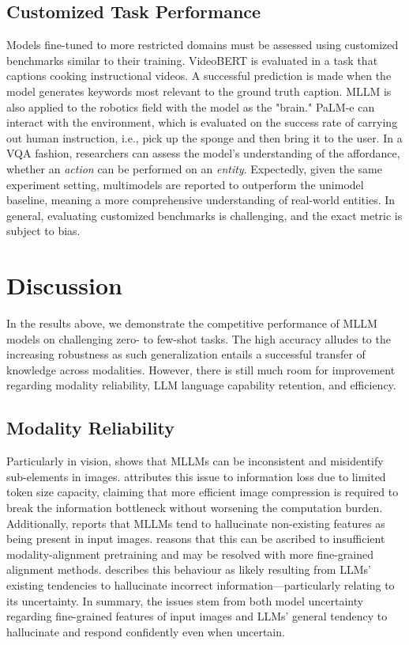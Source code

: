 \documentclass[11pt]{article}
\begin{document}
\subsection{Customized Task Performance}
Models fine-tuned to more restricted domains must be assessed using customized benchmarks similar to their training. VideoBERT \citep{DBLP:conf/iccv/SunMV0S19} is evaluated in a task that captions cooking instructional videos. A successful prediction is made when the model generates keywords most relevant to the ground truth caption. MLLM is also applied to the robotics field with the model as the "brain." PaLM-e \citep{DBLP:conf/icml/DriessXSLCIWTVY23} can interact with the environment, which is evaluated on the success rate of carrying out human instruction, i.e., pick up the sponge and then bring it to the user. In a VQA fashion, researchers can assess the model's understanding of the affordance, whether an \textit{action} can be performed on an \textit{entity}. Expectedly, given the same experiment setting, multimodels are reported to outperform the unimodel baseline, meaning a more comprehensive understanding of real-world entities. In general, evaluating customized benchmarks is challenging, and the exact metric is subject to bias.

\section{Discussion}
In the results above, we demonstrate the competitive performance of MLLM models on challenging zero- to few-shot tasks. The high accuracy alludes to the increasing robustness as such generalization entails a successful transfer of knowledge across modalities. However, there is still much room for improvement regarding modality reliability, LLM language capability retention, and efficiency.

\subsection{Modality Reliability}
 Particularly in vision, \citet{fu2023mme} shows that MLLMs can be inconsistent and misidentify sub-elements in images. \citet{DBLP:journals/corr/abs-2306-13549} attributes this issue to information loss due to limited token size capacity, claiming that more efficient image compression is required to break the information bottleneck without worsening the computation burden. Additionally, \citet{fu2023mme} reports that MLLMs tend to hallucinate non-existing features as being present in input images. \citet{DBLP:journals/corr/abs-2306-13549} reasons that this can be ascribed to insufficient modality-alignment pretraining and may be resolved with more fine-grained alignment methods. \citep{DBLP:journals/csur/JiLFYSXIBMF23} describes this behaviour as likely resulting from LLMs' existing tendencies to hallucinate incorrect information—particularly relating to its uncertainty. In summary, the issues stem from both model uncertainty regarding fine-grained features of input images and LLMs' general tendency to hallucinate and respond confidently even when uncertain.
\end{document}
